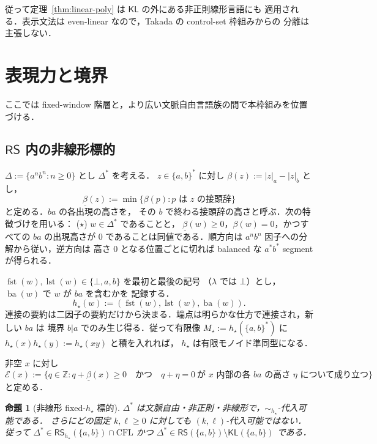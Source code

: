 \documentclass[11pt,a4paper]{ltjsarticle}
\newtheorem{proposition}[theorem]{命題}
\theoremstyle{remark}
\theoremstyle{plain}
\begin{document}
従って定理~\ref{thm:linear-poly} は $\mathsf{KL}$ の外にある非正則線形言語にも
適用される．表示文法は even-linear なので，Takada の control-set 枠組みからの
分離は主張しない．

\section{表現力と境界}
\label{sec:boundaries}

ここでは fixed-window 階層と，より広い文脈自由言語族の間で本枠組みを位置づける．

\subsection{\texorpdfstring{$\mathsf{RS}$}{RS} 内の非線形標的}

$\Delta:=\{a^nb^n:n\ge0\}$ とし $\Delta^*$ を考える．
$z\in\{a,b\}^*$ に対し $\beta(z):=|z|_a-|z|_b$ とし，
\[
 \underline\beta(z):=
 \min\{\beta(p):p\text{ は }z\text{ の接頭辞}\}
\]
と定める．$ba$ の各出現の高さを，
その $b$ で終わる接頭辞の高さと呼ぶ．次の特徴づけを用いる：
\textup{($\star$)} $w\in\Delta^*$ であることと，
$\underline\beta(w)\ge0$，$\beta(w)=0$，かつすべての $ba$ の出現高さが $0$
であることは同値である．順方向は $a^nb^n$ 因子への分解から従い，逆方向は
高さ $0$ となる位置ごとに切れば balanced な $a^*b^*$ segment が得られる．

$\operatorname{fst}(w),\operatorname{lst}(w)\in\{\bot,a,b\}$ を最初と最後の記号
（$\lambda$ では $\bot$）とし，$\operatorname{ba}(w)$ で $w$ が $ba$ を含むかを
記録する．
\[
 h_\star(w):=
 (\operatorname{fst}(w),\operatorname{lst}(w),\operatorname{ba}(w)).
\]
連接の要約は二因子の要約だけから決まる．端点は明らかな仕方で連接され，新しい $ba$ は
境界 $b|a$ でのみ生じ得る．従って有限像
$M_\star:=h_\star(\{a,b\}^*)$ に
$h_\star(x)h_\star(y):=h_\star(xy)$ と積を入れれば，
$h_\star$ は有限モノイド準同型になる．

非空 $x$ に対し
\[
 \mathcal E(x):=
 \{q\in\mathbb Z:
 q+\underline\beta(x)\ge0\quad\text{かつ}\quad
 q+\eta=0\ \text{が $x$ 内部の各 $ba$ の高さ $\eta$ について成り立つ}\}
\]
と定める．

\begin{proposition}[非線形 fixed-$h_\star$ 標的]
\label{prop:nonlinear-rs-example}
$\Delta^*$ は文脈自由・非正則・非線形で，$\sim_{h_\star}$-代入可能である．
さらにどの固定 $k,\ell\ge0$ に対しても $(k,\ell)$-代入可能ではない．従って
$\Delta^*\in\mathsf{RS}_{h_\star}(\{a,b\})\cap\mathrm{CFL}$ かつ
$\Delta^*\in\mathsf{RS}(\{a,b\})\setminus\mathsf{KL}(\{a,b\})$ である．
\end{proposition}
\end{document}
